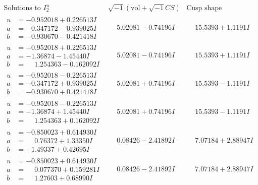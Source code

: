 \documentclass[1p]{elsarticle_modified}
\theoremstyle{definition}
\newcommand{\I}{\sqrt{-1}}
\begin{document}
$$\begin{array}{c|c|c}  
\text{Solutions to }I^u_{2}& \I (\text{vol} + \sqrt{-1}CS) & \text{Cusp shape}\\
 \hline 
\begin{aligned}
u &= -0.952018 + 0.226513 I \\
a &= -0.347172 - 0.939025 I \\
b &= -0.930670 - 0.421418 I\end{aligned}
 & \phantom{-}5.02081 - 0.74196 I & \phantom{-}15.5393 + 1.1191 I \\ \hline\begin{aligned}
u &= -0.952018 + 0.226513 I \\
a &= -1.36874 - 1.45440 I \\
b &= \phantom{-}1.254363 - 0.162092 I\end{aligned}
 & \phantom{-}5.02081 - 0.74196 I & \phantom{-}15.5393 + 1.1191 I \\ \hline\begin{aligned}
u &= -0.952018 - 0.226513 I \\
a &= -0.347172 + 0.939025 I \\
b &= -0.930670 + 0.421418 I\end{aligned}
 & \phantom{-}5.02081 + 0.74196 I & \phantom{-}15.5393 - 1.1191 I \\ \hline\begin{aligned}
u &= -0.952018 - 0.226513 I \\
a &= -1.36874 + 1.45440 I \\
b &= \phantom{-}1.254363 + 0.162092 I\end{aligned}
 & \phantom{-}5.02081 + 0.74196 I & \phantom{-}15.5393 - 1.1191 I \\ \hline\begin{aligned}
u &= -0.850023 + 0.614930 I \\
a &= \phantom{-}0.76372 + 1.33350 I \\
b &= -1.49337 + 0.42695 I\end{aligned}
 & \phantom{-}0.08426 - 2.41892 I & \phantom{-}7.07184 + 2.88947 I \\ \hline\begin{aligned}
u &= -0.850023 + 0.614930 I \\
a &= \phantom{-}0.077370 + 0.159281 I \\
b &= \phantom{-}1.27603 + 0.68990 I\end{aligned}
 & \phantom{-}0.08426 - 2.41892 I & \phantom{-}7.07184 + 2.88947 I \\ \hline\begin{aligned}

\end{aligned}
\end{array}$$
\end{document}
